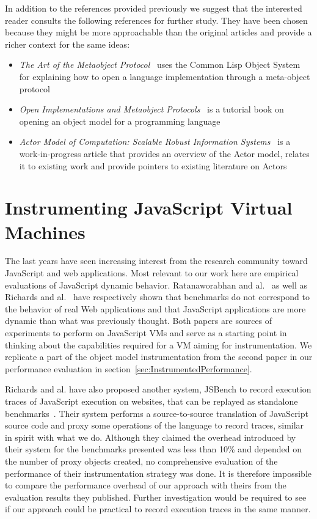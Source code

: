In addition to the references provided previously we suggest that the
interested reader consults the following references for further study. They have
been chosen because they might be more approachable than the original articles
and provide a richer context for the same ideas:
\begin{itemize}
    \item \textit{The Art of the Metaobject Protocol}~\cite{Kiczales:1991} uses
        the Common Lisp Object System for explaining how to open a
        language implementation through a meta-object protocol
    \item \textit{Open Implementations and Metaobject
        Protocols}~\cite{Kickzales:1996} is a tutorial book on opening an object
        model for a programming language
    \item \textit{Actor Model of Computation: Scalable Robust Information
        Systems}~\cite{DBLP:journals/corr/abs-1008-1459} is a work-in-progress
        article that provides an overview of the Actor model, relates it to
        existing work and provide pointers to existing literature on Actors 
\end{itemize}

\section{Instrumenting JavaScript Virtual Machines}
The last years have seen increasing interest from the research community toward
JavaScript and web applications. Most relevant to our work here are empirical
evaluations of JavaScript dynamic behavior. Ratanaworabhan and
al.~\cite{jsmeter} as well as Richards and al.~\cite{behavior_js} have
respectively shown that benchmarks do not correspond to the behavior of real
Web applications and that JavaScript applications are more dynamic than what
was previously thought. Both papers are sources of experiments to perform on
JavaScript VMs and serve as a starting point in thinking about the capabilities
required for a VM aiming for instrumentation. We replicate a part of the object
model instrumentation from the second paper in our performance evaluation in
section~\ref{sec:InstrumentedPerformance}.

Richards and al. have also proposed another system, JSBench to record execution
traces of JavaScript execution on websites, that can be replayed as standalone
benchmarks~\cite{Richards:2011}. Their system performs a source-to-source
translation of JavaScript source code and proxy some operations of the language
to record traces, similar in spirit with what we do. Although they claimed the
overhead introduced by their system for the benchmarks presented was less than
10\% and depended on the number of proxy objects created, no comprehensive
evaluation of the performance of their instrumentation strategy was done. It is
therefore impossible to compare the performance overhead of our approach with
theirs from the evaluation results they published. Further investigation would
be required to see if our approach could be practical to record execution
traces in the same manner.

